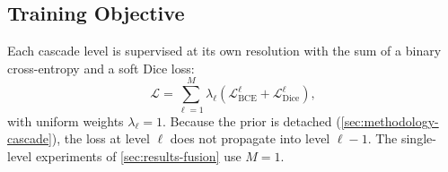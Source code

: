 \subsection{Training Objective}\label{sec:methodology-objective}

Each cascade level is supervised at its own resolution with the sum of a
binary cross-entropy and a soft Dice loss:
%
\begin{equation}
  \mathcal{L} = \sum_{\ell=1}^{M} \lambda_\ell \left( \mathcal{L}_{\text{BCE}}^\ell + \mathcal{L}_{\text{Dice}}^\ell \right),
  \label{eq:loss}
\end{equation}
%
with uniform weights $\lambda_\ell = 1$. Because the prior is detached
(\autoref{sec:methodology-cascade}), the loss at level $\ell$ does not
propagate into level $\ell{-}1$. The single-level experiments of
\autoref{sec:results-fusion} use $M = 1$.